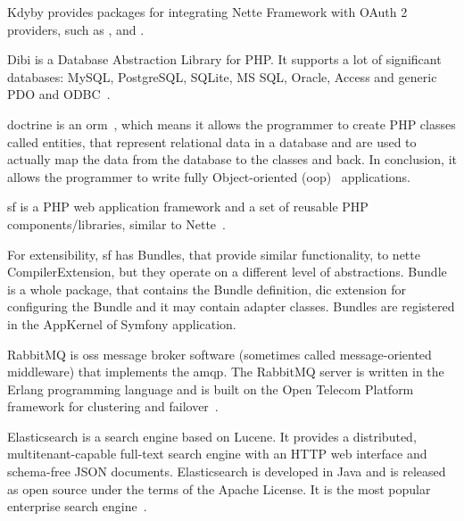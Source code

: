 Kdyby provides packages for integrating Nette Framework with OAuth 2 providers, such as ,  and .

 \label{sec:theory:dibi}

Dibi is a Database Abstraction Library for PHP. It supports a lot of significant databases: MySQL, PostgreSQL, SQLite, MS SQL, Oracle, Access and generic PDO and ODBC~\cite{dibi:homepage}.

 \label{sec:theory:doctrine}

\gls{doctrine} is an \gls{orm}~\cite{wiki:orm}, which means it allows the programmer to create PHP classes called entities, that represent relational data in a database and are used to actually map the data from the database to the classes and back. In conclusion, it allows the programmer to write fully Object-oriented (\acrshort{oop})~\cite{wiki:oop} applications.

 \label{sec:theory:symfony}

\gls{sf} is a PHP web application framework and a set of reusable PHP components/libraries, similar to Nette~\cite{wiki:symfony}.

For extensibility, \gls{sf} has Bundles, that provide similar functionality, to \gls{nette} CompilerExtension, but they operate on a different level of abstractions. Bundle is a whole package, that contains the Bundle definition, \gls{dic} extension for configuring the Bundle and it may contain adapter classes. Bundles are registered in the AppKernel of Symfony application.

 \label{sec:theory:rabbitmq}

RabbitMQ is \gls{oss} message broker software (sometimes called message-oriented middleware) that implements the \gls{amqp}. The RabbitMQ server is written in the Erlang programming language and is built on the Open Telecom Platform framework for clustering and failover~\cite{wiki:rabbitmq}.

 \label{sec:theory:elasticsearch}

Elasticsearch is a search engine based on Lucene. It provides a distributed, multitenant-capable full-text search engine with an HTTP web interface and schema-free JSON documents. Elasticsearch is developed in Java and is released as open source under the terms of the Apache License. It is the most popular enterprise search engine~\cite{wiki:elasticsearch}.

